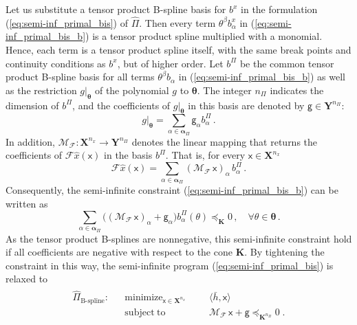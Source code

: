 \documentclass{article}
\DeclareMathOperator*{\minimize}{minimize}
\DeclareMathOperator*{\subj}{subject\;to}
\newcommand{\ppar}{\theta}                          %
\newcommand{\Ppar}{{\bm{\theta}}}                   %
\newcommand{\X}{\mathbf{X}}                         %
\newcommand{\Y}{\mathbf{Y}}                         %
\newcommand{\K}{\mathbf{K}}                         %
\newcommand{\calF}{\mathcal{F}}                     %
\newcommand{\bx}{b^x}               %
\newcommand{\bxa}{\bx_\alpha}       %
\newcommand{\cx}{\textsf{x}}        %
\newcommand{\nx}{{n_x}}             %
\newcommand{\Alpha}{\bm{\alpha}}    %
\newcommand{\meanh}{\bar{h}}        %
\newcommand{\bPi}{b^\Pi}                %
\newcommand{\bPia}{b^\Pi_\alpha}        %
\newcommand{\nPi}{{n_\Pi}}              %
\newcommand{\cg}{\textsf{g}}            %
\newcommand{\cga}{\textsf{g}_\alpha}    %
\newcommand{\calMF}{\mathcal{M}_{\mathcal{F}}}              %
\begin{document}
Let us substitute a tensor product B-spline basis for $\bx$ in the formulation (\ref{eq:semi-inf_primal_bis}) of $\hat{\Pi}$. Then every term $\ppar^\beta \bxa$ in (\ref{eq:semi-inf_primal_bis_b}) is a tensor product spline multiplied with a monomial. Hence, each term is a tensor product spline itself, with the same break points and continuity conditions as $\bx$, but of higher order. Let $\bPi$ be the common tensor product B-spline basis for all terms $\ppar^\beta b_\alpha$ in (\ref{eq:semi-inf_primal_bis_b}) as well as the restriction $g|_\Ppar$ of the polynomial $g$ to $\Ppar$. The integer $\nPi$ indicates the dimension of $\bPi$, and the coefficients of $g|_\Ppar$ in this basis are denoted by $\cg\in\Y^\nPi$:
\[ g|_\Ppar = \sum_{\alpha\in\Alpha_\Pi} \cga \bPia\,.%
\]
In addition, $\calMF:\X^\nx \rightarrow \Y^\nPi$ denotes the linear mapping that returns the coefficients of $\calF\hat{x}(\cx)$ in the basis $\bPi$. That is, for every $\cx\in\X^\nx $
\[ \calF\hat{x}(\cx) = \sum_{\alpha\in\Alpha_\Pi} (\calMF \, \cx)_\alpha \, \bPia\,. %
\]
Consequently, the semi-infinite constraint (\ref{eq:semi-inf_primal_bis_b}) can be written as
\[ \sum_{\alpha\in\Alpha_\Pi} \big( (\calMF \, \cx)_\alpha + \cga \big) \bPia(\ppar) \preceq_\K 0\,,\quad\forall\ppar\in\Ppar\,.%
\]
As the tensor product B-splines are nonnegative, this semi-infinite constraint hold if all coefficients are negative with respect to the cone $\K$. By tightening the constraint in this way, the semi-infinite program (\ref{eq:semi-inf_primal_bis}) is relaxed to
\begin{gather}\label{eq:Bprog_primal}
\begin{aligned}
\hat{\Pi}_{\text{B-spline}}: && \minimize_{\cx\in\X^\nx} &&& \langle \meanh, \cx \rangle  \\%
                             && \subj                    &&& \calMF \, \cx + \cg \preceq_{\K^\nPi} 0 \;.%
\end{aligned}
\end{gather}
\end{document}
